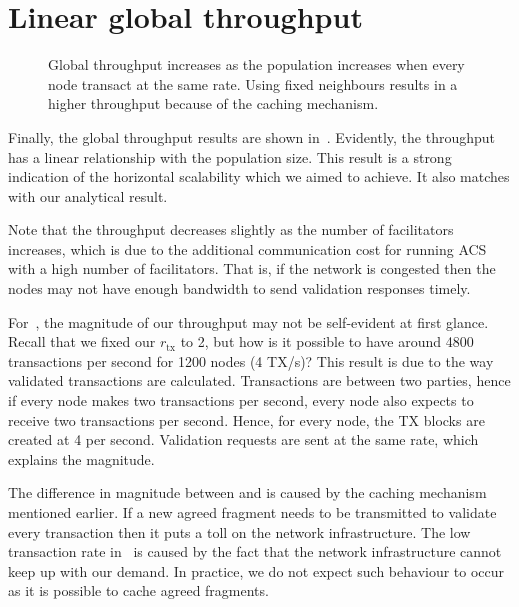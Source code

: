 \section{Linear global throughput}
\begin{figure}[h]
  \centering
  \caption{Global throughput increases as the population increases when every node transact at the same rate.
  Using fixed neighbours results in a higher throughput because of the caching mechanism.}
  \label{fig:global-throughput}
\end{figure}


Finally, the global throughput results are shown in~.
Evidently, the throughput has a linear relationship with the population size.
This result is a strong indication of the horizontal scalability which we aimed to achieve.
It also matches with our analytical result.

Note that the throughput decreases slightly as the number of facilitators increases,
which is due to the additional communication cost for running ACS with a high number of facilitators.
That is, if the network is congested then the nodes may not have enough bandwidth to send validation responses timely.

For~,
the magnitude of our throughput may not be self-evident at first glance.
Recall that we fixed our $r_\text{tx}$ to 2, but how is it possible to have around 4800 transactions per second for 1200 nodes (4 TX/s)?
This result is due to the way validated transactions are calculated.
Transactions are between two parties, hence if every node makes two transactions per second,
every node also expects to receive two transactions per second.
Hence, for every node, the TX blocks are created at 4 per second.
Validation requests are sent at the same rate, which explains the magnitude.

The difference in magnitude between  and  is caused by the caching mechanism mentioned earlier.
If a new agreed fragment needs to be transmitted to validate every transaction then it puts a toll on the network infrastructure.
The low transaction rate in~ is caused by the fact that the network infrastructure cannot keep up with our demand.
In practice, we do not expect such behaviour to occur as it is possible to cache agreed fragments.

